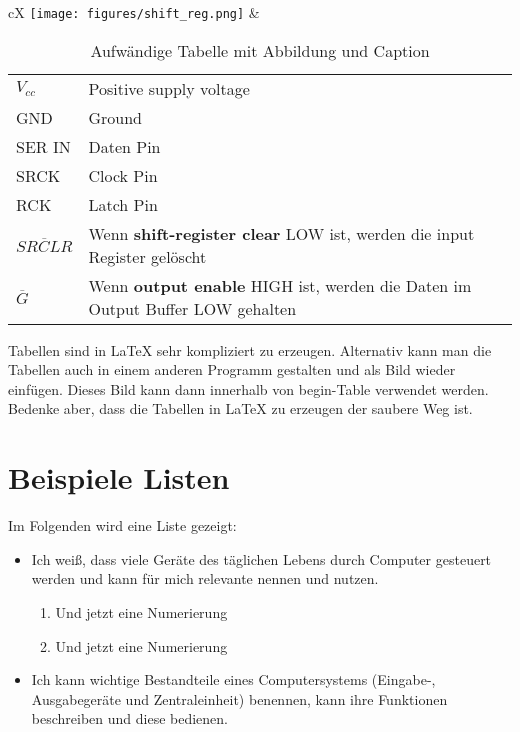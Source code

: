 \begin{table}
	\begin{center}
		\begin{tabularx}{\textwidth}{ cX  }
			\texttt{[image: figures/shift\_reg.png]} &
			{\begin{tabularx}{\cellwidth}{ lX  }
						$V_{cc}$           & Positive supply voltage                                                              \\
						GND                & Ground                                                                               \\
						SER IN             & Daten Pin                                                                            \\
						SRCK               & Clock Pin                                                                            \\
						RCK                & Latch Pin                                                                            \\
						$\overline{SRCLR}$ & Wenn \textbf{shift-register clear} LOW ist, werden die input Register gelöscht       \\
						$\overline{G}$     & Wenn \textbf{output enable} HIGH ist, werden die Daten im Output Buffer LOW gehalten
					\end{tabularx}   }
		\end{tabularx}
		\caption{Aufwändige Tabelle mit Abbildung und Caption}
		\label{tbl:shiftReg}
	\end{center}
\end{table}

Tabellen sind in \LaTeX{} sehr kompliziert zu erzeugen. Alternativ kann man die
Tabellen auch in einem anderen Programm gestalten und als Bild wieder einfügen.
Dieses Bild kann dann innerhalb von begin-Table verwendet werden. Bedenke aber,
dass die Tabellen in \LaTeX{} zu erzeugen der saubere Weg ist.

\section{Beispiele Listen}
Im Folgenden wird eine Liste gezeigt:
\begin{itemize}
	\item Ich weiß, dass viele Geräte des täglichen Lebens durch Computer
	      gesteuert werden und kann für mich relevante nennen und nutzen.
	      \begin{enumerate}
		      \item Und jetzt eine Numerierung
		      \item Und jetzt eine Numerierung
	      \end{enumerate}
	\item Ich kann wichtige Bestandteile eines Computersystems (Eingabe-,
	      Ausgabegeräte und Zentraleinheit) benennen, kann ihre Funktionen beschreiben
	      und diese bedienen.
\end{itemize}

